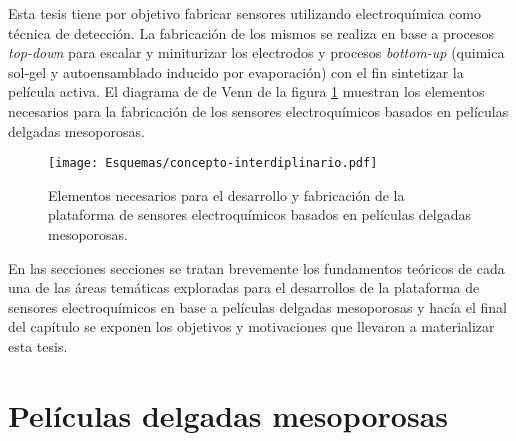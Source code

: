     Esta tesis tiene por objetivo fabricar sensores utilizando electroquímica como técnica de detección. La fabricación de los mismos se realiza en base a procesos \textit{top-down} para escalar y miniturizar los electrodos y procesos \textit{bottom-up} (quimica sol-gel y autoensamblado inducido por evaporación) con el fin sintetizar la película activa. El diagrama de  de Venn de la figura \ref{fig:sensores} muestran los elementos necesarios para la fabricación de los sensores electroquímicos basados en películas delgadas mesoporosas. 
	
	       \begin{figure}[ht!]
 				\begin{center}
 				\texttt{[image: Esquemas/concepto-interdiplinario.pdf]}
 				\caption[Plataforma de sensores. Diagrama de Venn.]{Elementos necesarios para el desarrollo y fabricación de la plataforma de sensores electroquímicos basados en películas delgadas mesoporosas.}
 		   		\label{fig:sensores}
 		    	\end{center}
 		    	\end{figure}
 	
 	En las secciones secciones se tratan brevemente los fundamentos teóricos de cada una de las áreas temáticas exploradas para el desarrollos de la plataforma de sensores electroquímicos en base a películas delgadas mesoporosas y hacía el final del capítulo se exponen los objetivos y motivaciones que llevaron a materializar esta tesis.

\section{Películas delgadas mesoporosas}\label{sec:mesoporosos}







